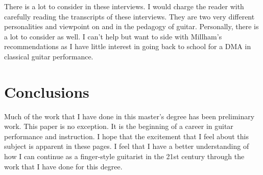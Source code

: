 \documentclass[12pt]{article}
\begin{document}
There is a lot to consider in these interviews. I would charge the
reader with carefully reading the transcripts of these
interviews. They are two very different personalities and viewpoint on
and in the pedagogy of guitar. Personally, there is a lot to consider
as well. I can't help but want to side with Millham's recommendations
as I have little interest in going back to school for a DMA in
classical guitar performance.

\section{Conclusions}
\label{sec:conclusions}
Much of the work that I have done in this master's degree has been
preliminary work. This paper is no exception. It is the beginning of a
career in guitar performance and instruction. I hope that the
excitement that I feel about this subject is apparent in these
pages. I feel that I have a better understanding of how I can continue
as a finger-style guitarist in the 21st century through the work that
I have done for this degree.
\clearpage
\printbibliography
\clearpage


\end{document}
